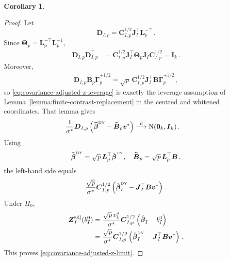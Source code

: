 \documentclass{article}
\newtheorem{corollary}[theorem]{Corollary}
\theoremstyle{definition}
\newcommand*{\bb}{\boldsymbol}
\newcommand{\betady}{\ensuremath{\hat{\bbeta}^{\textrm{\tiny DY}}}}
\def\bv{\bb{v}}
\def\bTheta{\bb{\Theta}}
\def\bbeta{\bb{\beta}}
\begin{document}
\begin{bibunit}
\begin{corollary}
\end{corollary}
\endgroup

\begin{proof}
Let
\begin{equation}
\label{eq:covariance-adjusted-z-whitened-contrast}
    \bb D_{I,p}
    =
    \bb C_{I,p}^{1/2}
    \bb J_I^\top
    \bb L_p^{-\top}\,.
\end{equation}
Since
$\bTheta_p=\bb L_p^{-\top}\bb L_p^{-1}$,
\begin{equation}
\begin{aligned}
    \bb D_{I,p}\bb D_{I,p}^\top
    &=
    \bb C_{I,p}^{1/2}
    \bb J_I^\top
    \bTheta_p
    \bb J_I
    \bb C_{I,p}^{1/2}
    =
    \bb I_k\,.
\end{aligned}
\end{equation}
Moreover,
\begin{equation}
\begin{aligned}
    \bb D_{I,p}
    \widetilde{\bb B}_p
    \widetilde{\bb\Gamma}_p^{+1/2}
    =
    \sqrt p\,
    \bb C_{I,p}^{1/2}
    \bb J_I^\top
    \bb B
    \widetilde{\bb\Gamma}_p^{+1/2}\,,
\end{aligned}
\end{equation}
so \eqref{eq:covariance-adjusted-z-leverage} is exactly the leverage
assumption of Lemma~\ref{lemma:finite-contrast-replacement} in the centred
and whitened coordinates. That lemma gives
\begin{equation}
\begin{aligned}
    &\frac1{\sigma^*}
    \bb D_{I,p}
    \left(
        \widetilde{\bbeta}^{\textrm{\tiny DY}}
        -
        \widetilde{\bb B}_p\bv^*
    \right)
    \overset{\mathrm d}{\longrightarrow}
    \mathrm N(\bb0_k,\bb I_k)\,.
\end{aligned}
\end{equation}
Using
$$
    \widetilde{\bbeta}^{\textrm{\tiny DY}}
    =
    \sqrt p\,\bb L_p^\top\betady,
    \quad
    \widetilde{\bb B}_p
    =
    \sqrt p\,\bb L_p^\top\bb B\,,
$$
the left-hand side equals
$$
    \frac{\sqrt p}{\sigma^*}
    \bb C_{I,p}^{1/2}
    \left(
        \betady_I-\bb J_I^\top\bb B\bv^*
    \right)\,.
$$
Under $H_0$,
\begin{equation}
\begin{aligned}
    \bb Z_I^{\mathrm{adj}}(b_I^0)
    &=
    \frac{\sqrt p\,v_1^*}{\sigma^*}
    \bb C_{I,p}^{1/2}
    \left(
        \check{\bbeta}_I-b_I^0
    \right)
    \\
    &=
    \frac{\sqrt p}{\sigma^*}
    \bb C_{I,p}^{1/2}
    \left(
        \betady_I-\bb J_I^\top\bb B\bv^*
    \right)\,.
\end{aligned}
\end{equation}
This proves \eqref{eq:covariance-adjusted-z-limit}.
\end{proof}



\end{bibunit}
\end{document}
